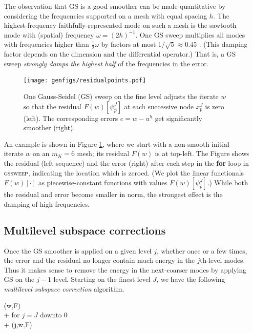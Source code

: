 \documentclass[letterpaper,final,12pt,reqno]{amsart}
\theoremstyle{claim}
\numberwithin{equation}{section}
\numberwithin{figure}{section}
\numberwithin{table}{section}
\begin{document}
The observation that GS is a good smoother can be made quantitative by considering the frequencies supported on a mesh with equal spacing $h$.  The highest-frequency faithfully-represented mode on such a mesh is the sawtooth mode with (spatial) frequency $\omega=(2h)^{-1}$.  One GS sweep multiplies all modes with frequencies higher than $\frac{1}{2} \omega$ by factors at most $1/\sqrt{5}\approx 0.45$ \cite[Chapter 4]{Briggsetal2000}.  (This damping factor depends on the dimension and the differential operator.)  That is, a GS sweep \emph{strongly damps the highest half} of the frequencies in the error.

\begin{figure}[t]
\texttt{[image: genfigs/residualpoints.pdf]}
\caption{One Gauss-Seidel (GS) sweep on the fine level adjusts the iterate $w$ so that the residual $F(w)[\psi_p^J]$ at each successive node $x_p^J$ is zero (left).  The corresponding errors $e=w-u^h$ get significantly smoother (right).}
\label{fig:residualpoints}
\end{figure}

An example is shown in Figure \ref{fig:residualpoints}, where we start with a non-smooth initial iterate $w$ on an $m_K=6$ mesh; its residual $F(w)$ is at top-left.  The Figure shows the residual (left sequence) and the error (right) after each step in the \textbf{for} loop in \textsc{gssweep}, indicating the location which is zeroed.  (We plot the linear functionals $F(w)[\cdot]$ as piecewise-constant functions with values $F(w)[\psi_p^J]$.)  While both the residual and error become smaller in norm, the strongest effect is the damping of high frequencies.

\subsection*{Multilevel subspace corrections}  Once the GS smoother is applied on a given level $j$, whether once or a few times, the error and the residual no longer contain much energy in the $j$th-level modes.  Thus it makes sense to remove the energy in the next-coarser modes by applying GS on the $j-1$ level.  Starting on the finest level $J$, we have the following \emph{multilevel subspace correction} algorithm.
\begin{pseudo*}
(w,F)\text{:} \\+
    for $j=J$ downto $0$ \\+
        (j,w,F)
\end{pseudo*}
\end{document}
